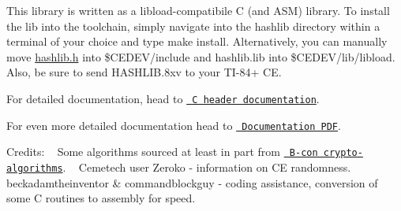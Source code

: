This library is written as a libload-\/compatibile C (and ASM) library. To install the lib into the toolchain, simply navigate into the hashlib directory within a terminal of your choice and type {\ttfamily make install}. Alternatively, you can manually move {\ttfamily \mbox{\hyperlink{hashlib_8h}{hashlib.\+h}}} into {\ttfamily \$\+CEDEV/include} and {\ttfamily hashlib.\+lib} into {\ttfamily \$\+CEDEV/lib/libload}. Also, be sure to send {\ttfamily HASHLIB.\+8xv} to your TI-\/84+ CE.

For detailed documentation, head to \href{https://acagliano.github.io/hashlib/html/hashlib_8h.html}{\texttt{ C header documentation}}.

For even more detailed documentation head to \href{https://github.com/acagliano/hashlib/blob/stable/Hashlib\%20Documentation.pdf}{\texttt{ Documentation PDF}}.

Credits\+: ~\newline
 Some algorithms sourced at least in part from \href{https://github.com/B-Con/crypto-algorithms}{\texttt{ B-\/con crypto-\/algorithms}}. ~\newline
 Cemetech user Zeroko -\/ information on CE randomness. ~\newline
 beckadamtheinventor \& commandblockguy -\/ coding assistance, conversion of some C routines to assembly for speed. ~\newline
 